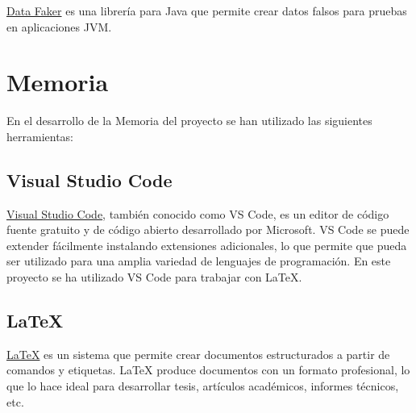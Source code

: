\href{https://www.datafaker.net/}{Data Faker} es una librería para Java que permite crear datos falsos para pruebas en aplicaciones JVM. 



\newpage
\section{Memoria}

En el desarrollo de la Memoria del proyecto se han utilizado las siguientes herramientas: 

\subsection{Visual Studio Code}

\href{https://code.visualstudio.com/}{Visual Studio Code}, también conocido como VS Code, es un editor de código fuente gratuito y de código abierto
 desarrollado por Microsoft. VS Code se puede extender fácilmente instalando extensiones adicionales, lo que permite que pueda ser utilizado para una
  amplia variedad de lenguajes de programación. En este proyecto se ha utilizado VS Code para trabajar con LaTeX.

\subsection{LaTeX}

\href{https://www.latex-project.org/}{LaTeX} es un sistema que permite crear documentos estructurados a partir de comandos y etiquetas. 
LaTeX produce documentos con un formato profesional, lo que lo hace ideal para desarrollar tesis, artículos académicos, informes técnicos, etc.

